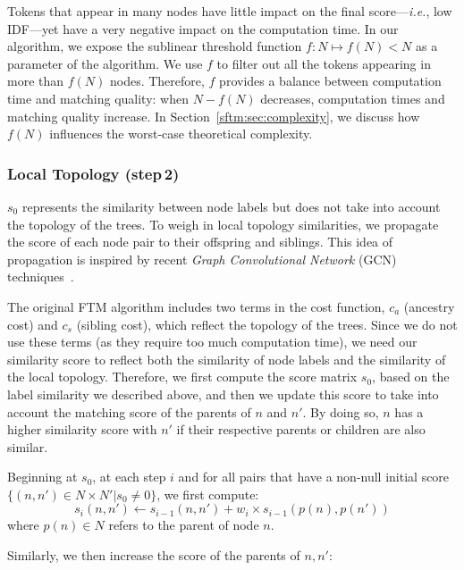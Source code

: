 Tokens that appear in many nodes have little impact on the final score---\emph{i.e.}, low IDF---yet have a very negative impact on the computation time.
In our algorithm, we expose the sublinear threshold function $f: N \mapsto f(N) < N$ as a parameter of the algorithm.
We use $f$ to filter out all the tokens appearing in more than $f(N)$ nodes.
Therefore, $f$ provides a balance between computation time and matching quality: when $N-f(N)$ decreases, computation times and matching quality increase.
In Section~\ref{sftm:sec:complexity}, we discuss how $f(N)$ influences the worst-case theoretical complexity.

\subsubsection{Local Topology (step\,2)}
$s_{0}$ represents the similarity between node labels but does not take into account the topology of the trees.
To weigh in local topology similarities, we propagate the score of each node pair to their offspring and siblings.
This idea of propagation is inspired by recent \emph{Graph Convolutional Network} (GCN) techniques~\cite{kipf2016semi}.

The original FTM algorithm includes two terms in the cost function, $c_a$ (ancestry cost) and $c_s$ (sibling cost), which reflect the topology of the trees.
Since we do not use these terms (as they require too much computation time), we need our similarity score to reflect both the similarity of node labels and the similarity of the local topology.
Therefore, we first compute the score matrix $s_0$, based on the label similarity we described above, and then we update this score to take into account the matching score of the parents of $n$ and $n'$.
By doing so, $n$ has a higher similarity score with $n'$ if their respective parents or children are also similar.

Beginning at $s_0$, at each step $i$ and for all pairs that have a non-null initial score  $\{(n, n')\in N \times N' | s_0 \neq 0\}$, we first compute:
\begin{equation}\label{eq:score}
	s_{i}(n, n') \gets s_{i-1}(n, n') +  w_i \times s_{i-1}(p(n), p(n'))
\end{equation}
where $p(n) \in N$ refers to the parent of node $n$.

Similarly, we then increase the score of the parents of $n, n'$:

